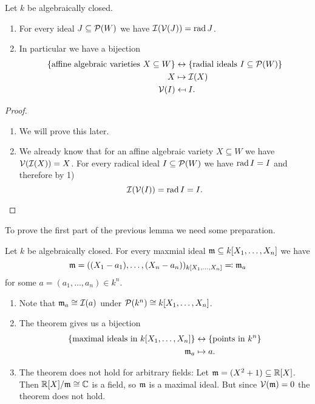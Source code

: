 \begin{prop}
 Let $k$ be algebraically closed.
 \begin{enumerate}[label=\emph{\alph*)},leftmargin=*]
  \item
   For every ideal $J \subseteq \mathcal{P}(W)$ we have $\mathcal{I}(\mathcal{V}(J)) = \operatorname{rad} J$.
  \item
   In particular we have a bijection
   \begin{align*}
    \{\text{affine algebraic varieties $X \subseteq W$}\} &\leftrightarrow \{\text{radial ideals $I \subseteq \mathcal{P}(W)$}\} \\
            X &\mapsto \mathcal{I}(X) \\
    \mathcal{V}(I) &\mapsfrom I.
  \end{align*}
 \end{enumerate}
\end{prop}
\begin{proof}
 \begin{enumerate}[label=\emph{\alph*)},leftmargin=*]
  \item
   We will prove this later.
  \item
   We already know that for an affine algebraic variety $X \subseteq W$ we have $\mathcal{V}(\mathcal{I}(X)) = X$. For every radical ideal $I \subseteq \mathcal{P}(W)$ we have $\operatorname{rad} I = I$ and therefore by 1)
   \[
    \mathcal{I}(\mathcal{V}(I)) = \operatorname{rad} I = I.
   \]
  \qedhere
 \end{enumerate}
\end{proof}


To prove the first part of the previous lemma we need some preparation.


\begin{thrm}
 Let $k$ be algebraically closed. For every maxmial ideal \mbox{$\mathfrak{m} \subseteq k[X_1, \dotsc, X_n]$} we have
 \[
  \mathfrak{m} = ((X_1 - a_1), \dotsc, (X_n - a_n))_{k[X_1, \dotsc, X_n]} \eqqcolon \mathfrak{m}_a
 \]
 for some $a = (a_1, \dotsc, a_n) \in k^n$.
\end{thrm}


\begin{rem}
 \begin{enumerate}[label=\emph{\alph*)},leftmargin=*]
  \item
   Note that $\mathfrak{m}_{a} \cong \mathcal{I}(a)$ under $\mathcal{P}(k^n) \cong k[X_1, \dotsc, X_n]$.
  \item
   The theorem gives us a bijection
   \begin{align*}
    \{\text{maximal ideals in $k[X_1, \dotsc, X_n]$}\} &\leftrightarrow \{\text{points in $k^n$}\} \\
    \mathfrak{m}_a &\mapsto a.
   \end{align*}
  \item
   The theorem does not hold for arbitrary fields: Let \mbox{$\mathfrak{m} = (X^2 + 1) \subseteq \mathbb{R}[X]$}. Then $\mathbb{R}[X]/\mathfrak{m} \cong \mathbb{C}$ is a field, so $\mathfrak{m}$ is a maximal ideal. But since $\mathcal{V}(\mathfrak{m}) = 0$ the theorem does not hold.
 \end{enumerate}
\end{rem}


